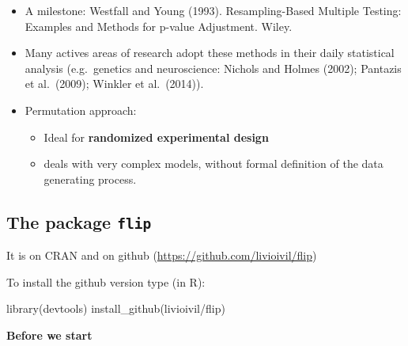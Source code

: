 \documentclass[
]{article}
\newenvironment{Shaded}{\begin{snugshade}}{\end{snugshade}}
\newcommand{\FunctionTok}[1]{\textcolor[rgb]{0.00,0.00,0.00}{#1}}
\newcommand{\NormalTok}[1]{#1}
\newcommand{\StringTok}[1]{\textcolor[rgb]{0.31,0.60,0.02}{#1}}
\providecommand{\tightlist}{%
  \setlength{\itemsep}{0pt}\setlength{\parskip}{0pt}}
\begin{document}
\begin{itemize}
\tightlist
\item
  A milestone: Westfall and Young (1993). Resampling-Based Multiple
  Testing: Examples and Methods for p-value Adjustment. Wiley.
\item
  Many actives areas of research adopt these methods in their daily
  statistical analysis (e.g.~genetics and neuroscience: Nichols and
  Holmes (2002); Pantazis et al.~(2009); Winkler et al.~(2014)).\\
\item
  Permutation approach:

  \begin{itemize}
  \tightlist
  \item
    Ideal for \textbf{randomized experimental design}\\
  \item
    deals with very complex models, without formal definition of the
    data generating process.
  \end{itemize}
\end{itemize}

\hypertarget{the-package-flip}{%
\subsection{\texorpdfstring{The package
\texttt{flip}}{The package flip}}\label{the-package-flip}}

It is on CRAN and on github (\url{https://github.com/livioivil/flip})

To install the github version type (in R):

\begin{Shaded}
\begin{Highlighting}[]
\FunctionTok{library}\NormalTok{(devtools)}
\FunctionTok{install\_github}\NormalTok{(}\StringTok{\textquotesingle{}livioivil/flip\textquotesingle{}}\NormalTok{)}
\end{Highlighting}
\end{Shaded}

\textbf{Before we start}
\end{document}
